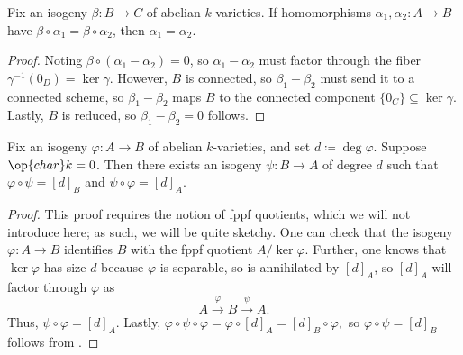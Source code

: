 \documentclass{amsart}
\begin{document}
\begin{lemma} \label{lem:cancel-isos}
	Fix an isogeny $\beta\colon B\to C$ of abelian $k$-varieties. If homomorphisms $\alpha_1,\alpha_2\colon A\to B$ have $\beta\circ\alpha_1=\beta\circ\alpha_2$, then $\alpha_1=\alpha_2$.
\end{lemma}
\begin{proof}
    Noting $\beta\circ(\alpha_1-\alpha_2)=0$, so $\alpha_1-\alpha_2$ must factor through the fiber $\gamma^{-1}(0_D)=\ker\gamma$. However, $B$ is connected, so $\beta_1-\beta_2$ must send it to a connected scheme, so $\beta_1-\beta_2$ maps $B$ to the connected component $\{0_C\}\subseteq\ker\gamma$. Lastly, $B$ is reduced, so $\beta_1-\beta_2=0$ follows.
\end{proof}
\begin{proposition} \label{prop:iso-reflect}
	Fix an isogeny $\varphi\colon A\to B$ of abelian $k$-varieties, and set $d\coloneqq\deg\varphi$. Suppose $\op{char}k=0$. Then there exists an isogeny $\psi\colon B\to A$ of degree $d$ such that $\varphi\circ\psi=[d]_B$ and $\psi\circ\varphi=[d]_A$.
\end{proposition}
\begin{proof}
	This proof requires the notion of fppf quotients, which we will not introduce here; as such, we will be quite sketchy. One can check that the isogeny $\varphi\colon A\to B$ identifies $B$ with the fppf quotient $A/\ker\varphi$. Further, one knows that $\ker\varphi$ has size $d$ because $\varphi$ is separable, so is annihilated by $[d]_A$, so $[d]_A$ will factor through $\varphi$ as
	\[A\stackrel\varphi\to B\stackrel\psi\to A.\]
	Thus, $\psi\circ\varphi=[d]_A$. Lastly, $\varphi\circ\psi\circ\varphi=\varphi\circ[d]_A=[d]_B\circ\varphi,$ so $\varphi\circ\psi=[d]_B$ follows from .
\end{proof}
\end{document}
